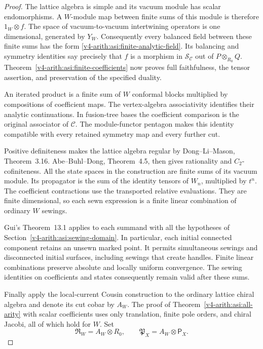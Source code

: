 \begin{proof}
The lattice algebra is simple and its vacuum module has scalar
endomorphisms. A $W$-module map between finite sums of this module
is therefore $1_W\otimes f$. The space of vacuum-to-vacuum
intertwining operators is one dimensional, generated by $Y_W$.
Consequently every balanced field between these finite sums has
the form \eqref{v4-arith:asi:finite-analytic-field}. Its balancing and
symmetry identities say precisely that $f$ is a morphism in
$\mathcal S_{\mathcal C}$ out of $P\otimes_{R_0}Q$.
Theorem~\ref{v4-arith:asi:finite-coefficients} now proves full faithfulness,
the tensor assertion, and preservation of the specified duality.

An iterated product is a finite sum of $W$ conformal blocks multiplied
by compositions of coefficient maps. The vertex-algebra associativity
identifies their analytic continuations. In fusion-tree bases the
coefficient comparison is the original associator of $\mathcal C$.
The module-functor pentagon makes this identity compatible with every
retained symmetry map and every further cut.

Positive definiteness makes the lattice algebra regular by
Dong--Li--Mason, Theorem~3.16. Abe--Buhl--Dong, Theorem~4.5,
then gives rationality and \(C_2\)-cofiniteness. All the state
spaces in the construction are finite sums of its vacuum module.
Its propagator is the sum of the identity tensors of $W_n$, multiplied
by $t^n$. The coefficient contractions use the transported relative
evaluations. They are finite dimensional, so each sewn expression is
a finite linear combination of ordinary $W$ sewings.

Gui's Theorem~13.1 applies to each summand with all the hypotheses of
Section~\ref{v4-arith:asi:sewing-domain}. In particular, each initial
connected component retains an unsewn marked point.
It permits simultaneous sewings and disconnected initial surfaces,
including sewings that create handles. Finite linear combinations preserve
absolute and locally uniform convergence. The sewing identities on
coefficients and states consequently remain valid after these sums.

Finally apply the local-current Cousin construction to the ordinary
lattice chiral algebra and denote its cut cobar by $A_W$.
The proof of Theorem~\ref{v4-arith:asi:all-arity} with scalar coefficients
uses only translation, finite pole orders, and chiral Jacobi, all of
which hold for $W$. Set
\[
 \mathfrak R_W=A_W\otimes R_0,\qquad
 \mathfrak P_X=A_W\otimes\mathsf P_X.
\]


\end{proof}

